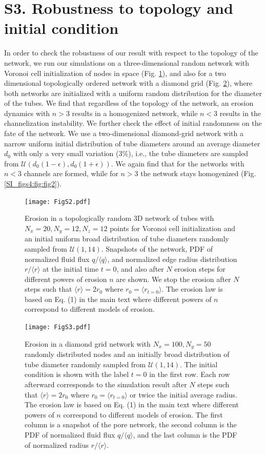 \documentclass[%
reprint,
 amsmath,amssymb,
 aps,
prl,
]{revtex4-1}
\begin{document}
\newpage
\section{S3. Robustness to topology and initial condition}
\label{s3}
% 
In order to check the robustness of our result with respect to the topology of the network, we run our simulations on a three-dimensional random network with Voronoi cell initialization of nodes in space (Fig. \ref{SIfig:fig2-3d}), and also for a two dimensional topologically ordered network with a diamond grid (Fig. \ref{fig:fig2-diamond}), where  both networks are initialized with a uniform random distribution for the diameter of the tubes. We find that regardless of the topology of the network, an erosion dynamics with $n>3$ results in a homogenized network, while $n<3$ results in the channelization instability. We further check the effect of initial randomness on the fate of the network. We use a two-dimensional diamond-grid network with a narrow uniform initial distribution of tube diameters around an average diameter $d_0$ with only a very small variation ($3\%$), i.e., the tube diameters are sampled from $\mathcal{U}(d_0(1-\epsilon), d_0(1+\epsilon))$. We again find that for the networks with $n<3$ channels are formed, while for $n>3$ the network stays homogenized (Fig. \ref{SI_figs4:fig:fig2}).  
%
\begin{figure}[htp]
      \texttt{[image: FigS2.pdf]}
     \caption{Erosion in a topologically random 3D network of tubes with $N_x=20, N_y=12, N_z=12$ points for Voronoi cell initialization and an initial uniform broad distribution of tube diameters randomly sampled from $\mathcal{U}(1,14)$. Snapshots of the network, PDF of normalized fluid flux $q/\langle q \rangle$, and normalized edge radius distribution $r/\langle r \rangle$ at the initial time $t=0$, and also after $N$ erosion steps for different powers of erosion $n$ are shown. We stop the erosion after $N$ steps such that $\langle r\rangle=2r_0$ where $r_0 = \langle r_{t=0}\rangle$. The erosion law is based on Eq. (1) in the main text where different powers of $n$ correspond to different models of erosion.}\label{SIfig:fig2-3d}
 \end{figure}
%
\begin{figure}[htp]
 \texttt{[image: FigS3.pdf]} %
     \caption{Erosion in a diamond grid network with $N_x=100, N_y=50$ randomly distributed nodes and an initially broad  distribution of tube diameter randomly sampled from $\mathcal{U}(1,14)$. The initial condition is shown with the label $t=0$ in the first row. Each row afterward corresponds to the simulation result after $N$ steps such that $\langle r\rangle=2r_0$ where $r_0 = \langle r_{t=0}\rangle$ or twice the initial average radius. The erosion law is based on Eq. (1) in the main text where different powers of $n$ correspond to different models of erosion. The first column is a snapshot of the pore network, the second column is the PDF of normalized fluid flux $q/\langle q \rangle$, and the last column is the PDF of normalized radius $r/\langle r\rangle$.}\label{fig:fig2-diamond}%
\end{figure}
\end{document}

